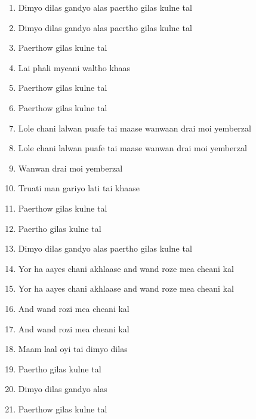 \documentclass[12pt]{article}
\newcommand{\bigroman}[1]{\fontsize{16pt}{18pt}\selectfont\RaggedRight #1}
\begin{document}
\begin{multicols}{2}
\begin{enumerate}[leftmargin=*, label=\arabic*., font=\fontsize{16pt}{18pt}\selectfont]
  \item \bigroman{Dimyo dilas gandyo alas paertho gilas kulne tal}
  \item \bigroman{Dimyo dilas gandyo alas paertho gilas kulne tal}
  \item \bigroman{Paerthow gilas kulne tal}
  \item \bigroman{Lai phali myeani waltho khaas}
  \item \bigroman{Paerthow gilas kulne tal}
  \item \bigroman{Paerthow gilas kulne tal}
  \item \bigroman{Lole chani lalwan puafe tai maase wanwaan drai moi yemberzal}
  \item \bigroman{Lole chani lalwan puafe tai maase wanwan drai moi yemberzal}
  \item \bigroman{Wanwan drai moi yemberzal}
  \item \bigroman{Truati man gariyo lati tai khaase}
  \item \bigroman{Paerthow gilas kulne tal}
  \item \bigroman{Paertho gilas kulne tal}
  \item \bigroman{Dimyo dilas gandyo alas paertho gilas kulne tal}
  \item \bigroman{Yor ha aayes chani akhlaase and wand roze mea cheani kal}
  \item \bigroman{Yor ha aayes chani akhlaase and wand roze mea cheani kal}
  \item \bigroman{And wand rozi mea cheani kal}
  \item \bigroman{And wand rozi mea cheani kal}
  \item \bigroman{Maam laal oyi tai dimyo dilas}
  \item \bigroman{Paertho gilas kulne tal}
  \item \bigroman{Dimyo dilas gandyo alas}
  \item \bigroman{Paerthow gilas kulne tal}
\end{enumerate}

\columnbreak


\end{multicols}
\end{document}
